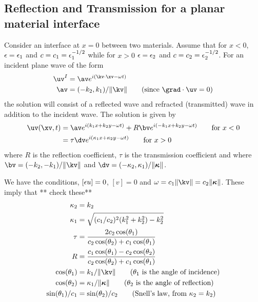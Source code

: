 \clearpage
\subsection{Reflection and Transmission for a planar material interface}


Consider an interface at $x=0$ between two materials.
Assume that for $x<0$, $\epsilon=\epsilon_1$ and $c=c_1=\epsilon_1^{-1/2}$ while for $x>0$ 
$\epsilon=\epsilon_2$ and $c=c_2=\epsilon_2^{-1/2}$.
For an incident plane wave
of the form
\begin{align*}
     \uv^I &= \av e^{ i (\kv\cdot\xv - \omega t)} \\
      \av &= (-k_2,k_1)/\| \kv \| \qquad\mbox{(since $\grad\cdot\uv=0$)}
\end{align*}
the solution will consist of a reflected wave and refracted (transmitted) wave in addition to the incident wave.
The solution is given by
\begin{align*}
  \uv(\xv,t) &= \av e^{ i (k_1 x + k_2 y - \omega t) } + R \bv e^{ i (-k_1 x + k_2 y - \omega t)} 
                                                                     \qquad\mbox{for $x<0$} \\
             &= \tau \dv e^{ i (\kappa_1 x + \kappa_2 y - \omega t)} \qquad\mbox{for $x>0$}
\end{align*}
where $R$ is the reflection coefficient, $\tau$ is the transmission coefficient and 
where $\bv=(-k_2,-k_1)/\| \kv \| $ and $\dv=(-\kappa_2,\kappa_1)/\| \kappav \|$.

We have the conditions, $[\epsilon u]=0$, $[v]=0$ and $\omega=c_1 \|\kv\|=c_2\|\kappav\|$.
These imply that ** check these**
\begin{align*}
   \kappa_2 &= k_2 \\
   \kappa_1 &= \sqrt{ (c_1/c_2)^2 (k_1^2+k_2^2) - k_2^2 } \\
   \tau &= { 2 c_2 \cos(\theta_1) \over c_2 \cos(\theta_2) + c_1 \cos(\theta_1) } \\
   R &= { c_1 \cos(\theta_1) - c_2 \cos(\theta_2) \over c_2 \cos(\theta_2) + c_1 \cos(\theta_1) } \\
   \cos(\theta_1) & = k_1/\|\kv\| \qquad\mbox{($\theta_1$ is the angle of incidence)} \\
  \cos(\theta_2) & = \kappa_1/\|\kappav\| \qquad\mbox{($\theta_2$ is the angle of reflection)} \\
   \sin(\theta_1)/c_1 &= \sin(\theta_2)/c_2 \qquad\mbox{(Snell's law, from $\kappa_2 = k_2$)}
\end{align*}  


